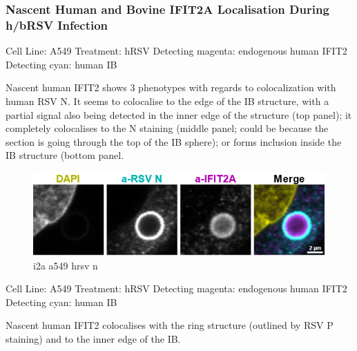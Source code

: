 \subsubsection{Nascent Human and Bovine IFIT2A Localisation During h/bRSV Infection} \label{Nascent Human and Bovine IFIT2A Localisation During h/bRSV Infection}
Cell Line: A549 \newline
Treatment: hRSV \newline
Detecting magenta: endogenous human IFIT2  \newline
Detecting cyan: human IB \newline

Nascent human IFIT2 shows 3 phenotypes with regards to colocalization with human RSV N. It seems to colocalise to the edge of the IB structure, with a partial signal also being detected in the inner edge of the structure (top panel); it completely colocalises to the N staining (middle panel; could be because the section is going through the top of the IB sphere); or forms inclusion inside the IB structure (bottom panel. 

\begin{figure}
    \centering
    \includegraphics[width=1\linewidth]{10. Chapter 5//Figs//01. I2A/04. i2a a549 hrsv n.png}
    \caption[i2a a549 hrsv n]{i2a a549 hrsv n}
    \label{fig:i2a a549 hrsv n}
\end{figure}

Cell Line: A549 \newline
Treatment: hRSV \newline
Detecting magenta: endogenous human IFIT2  \newline
Detecting cyan: human IB \newline

Nascent human IFIT2 colocalises with the ring structure (outlined by RSV P staining) and to the inner edge of the IB.

